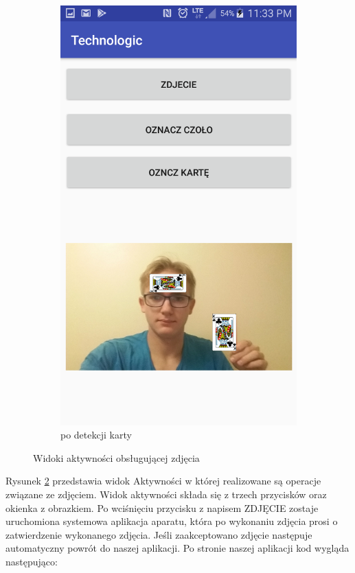 \documentclass{article}
\numberwithin{equation}{section}
\begin{document}
\begin{figure}[H]
\begin{subfigure}{0.25\textwidth}
        \includegraphics[width=\linewidth]{oba.png}
        \caption{po detekcji karty}
        \label{fig:zdjecieObo}
    \end{subfigure}
    \caption{Widoki aktywności obsługującej zdjęcia}
    \label{widokiPhoto}
\end{figure}

Rysunek \ref{widokiPhoto} przedstawia widok Aktywności w której realizowane są operacje związane ze zdjęciem. Widok aktywności składa się z trzech przycisków oraz okienka z obrazkiem. 
Po wciśnięciu przycisku z napisem ZDJĘCIE zostaje uruchomiona systemowa aplikacja aparatu, która po wykonaniu zdjęcia prosi o zatwierdzenie wykonanego zdjęcia. Jeśli zaakceptowano zdjęcie następuje automatyczny powrót do naszej aplikacji.
Po stronie naszej aplikacji kod wygląda następująco:
\end{document}
